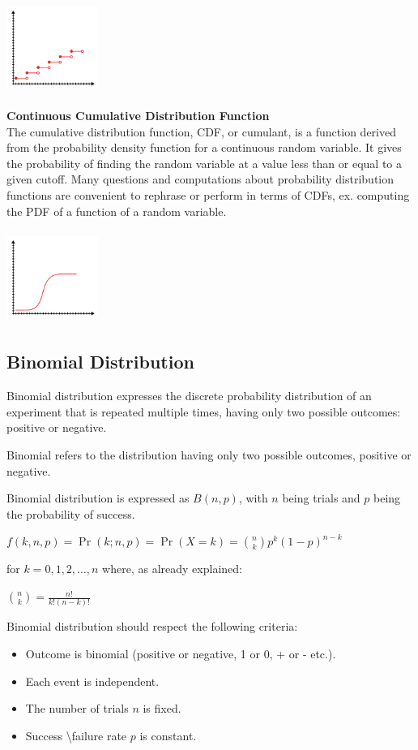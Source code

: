 \documentclass{article}
\begin{document}
\includegraphics[width=3cm, height=3cm]{discrete_cdf}

\textbf{Continuous Cumulative Distribution Function} \\
The cumulative distribution function, CDF, or cumulant, is a function derived from the probability density function for a continuous random variable. It gives the probability of finding the random variable at a value less than or equal to a given cutoff. Many questions and computations about probability distribution functions are convenient to rephrase or perform in terms of CDFs, ex. computing the PDF of a function of a random variable.

\includegraphics[width=3cm, height=3cm]{continuos_cdf}

\subsection{Binomial Distribution}
Binomial distribution expresses the discrete probability distribution of an experiment that is repeated multiple times, having only two possible outcomes: positive or negative. 

Binomial refers to the distribution having only two possible outcomes, positive or negative. 

Binomial distribution is expressed as $B(n,p)$, with $n$ being trials and $p$ being the probability of success. 

$ \displaystyle f(k,n,p)=\Pr(k;n,p)=\Pr(X=k)={\binom {n}{k}}p^{k}(1-p)^{n-k}$

for $k = 0, 1, 2, \ldots, n$ where, as already explained:

$ \displaystyle {\binom {n}{k}}={\frac {n!}{k!(n-k)!}}$

Binomial distribution should respect the following criteria:
\begin{itemize}
    \item Outcome is binomial (positive or negative, 1 or 0, + or - etc.).
    \item Each event is independent.
    \item The number of trials $n$ is fixed.
    \item Success \textbackslash failure rate $p$ is constant.
\end{itemize}
\end{document}

